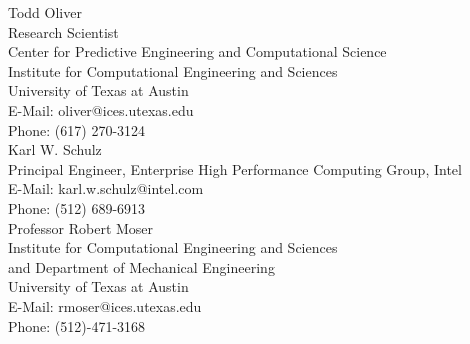 


\noindent Todd Oliver \\
Research Scientist \\
Center for Predictive Engineering and Computational Science \\
Institute for Computational Engineering and Sciences \\
University of Texas at Austin \\
E-Mail: oliver@ices.utexas.edu \\
Phone: (617) 270-3124 \\
\newline
\newline
Karl W. Schulz \\
Principal Engineer, Enterprise High Performance Computing Group, Intel \\
E-Mail: karl.w.schulz@intel.com \\
Phone: (512) 689-6913 \\
\newline
\newline
\noindent Professor Robert Moser \\
Institute for Computational Engineering and Sciences \\
and Department of Mechanical Engineering \\
University of Texas at Austin \\
E-Mail: rmoser@ices.utexas.edu \\
\noindent Phone: (512)-471-3168 
